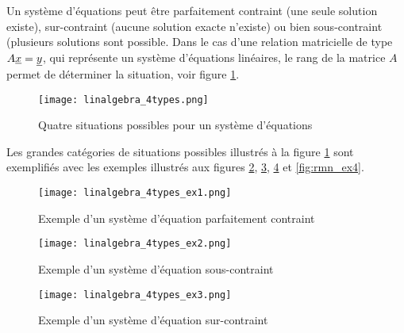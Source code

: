 Un système d'équations peut être parfaitement contraint (une seule solution existe), sur-contraint (aucune solution exacte n'existe) ou bien sous-contraint (plusieurs solutions sont possible. Dans le cas d'une relation matricielle de type $A \underline{x} = \underline{y} $, qui représente un système d’équations linéaires, le rang de la matrice $A$ permet de déterminer la situation, voir figure \ref{fig:rmn}.

\begin{figure}[htp]
	\centering
		\texttt{[image: linalgebra\_4types.png]}
	\caption{Quatre situations possibles pour un système d'équations}
	\label{fig:rmn}
\end{figure}

Les grandes catégories de situations possibles illustrés à la figure \ref{fig:rmn} sont exemplifiés avec les exemples illustrés aux figures \ref{fig:rmn_ex1}, \ref{fig:rmn_ex2}, \ref{fig:rmn_ex3} et \ref{fig:rmn_ex4}.

\begin{example}
\begin{figure}[H]
	\centering
		\texttt{[image: linalgebra\_4types\_ex1.png]}
	\caption{Exemple d'un système d'équation parfaitement contraint}
	\label{fig:rmn_ex1}
\end{figure}
\end{example}

\begin{example}
\begin{figure}[H]
	\centering
		\texttt{[image: linalgebra\_4types\_ex2.png]}
	\caption{Exemple d'un système d'équation sous-contraint}
	\label{fig:rmn_ex2}
\end{figure}
\end{example}

\begin{example}
\begin{figure}[H]
	\centering
		\texttt{[image: linalgebra\_4types\_ex3.png]}
	\caption{Exemple d'un système d'équation sur-contraint}
	\label{fig:rmn_ex3}
\end{figure}
\end{example}


